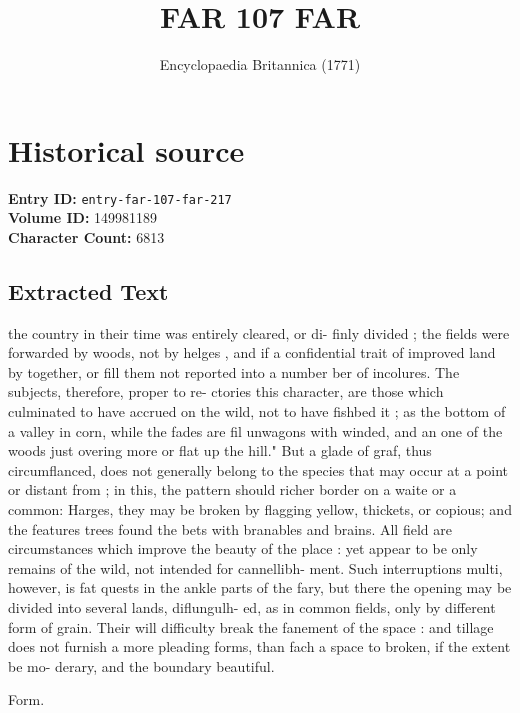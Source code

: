 \documentclass{article}
\title{FAR  107 FAR}
\date{Encyclopaedia Britannica (1771)}
\begin{document}
\maketitle

\section*{Historical source}
\textbf{Entry ID:} \texttt{entry-far-107-far-217} \\
\textbf{Volume ID:} 149981189 \\
\textbf{Character Count:} 6813

\subsection*{Extracted Text}
the country in their time was entirely cleared, or di-
finly divided ; the fields were forwarded by woods,
not by helges , and if a confidential trait of improved
land by together, or fill them not reported into a number
ber of incolures. The subjects, therefore, proper to re-
ctories this character, are those which culminated
to have accrued on the wild, not to have fishbed
it ; as the bottom of a valley in corn, while the fades
are fil unwagons with winded, and an one of the
woods just overing more or flat up
the hill." But a glade of graf, thus circumflanced,
does not generally belong to the species that may
occur at a point or distant from ; in this, the pattern
should richer border on a waite or a common: Harges,
they may be broken by flagging yellow, thickets, or
copious; and the features trees found the bets with
branables and brains. All field are circumstances
which improve the beauty of the place : yet appear to
be only remains of the wild, not intended for cannellibh-
ment. Such interruptions multi, however, is fat
quests in the ankle parts of the fary, but
there the opening may be divided into several lands, diflungulh-
ed, as in common fields, only by different form of grain.
Their will difficulty break the fanement of
the space : and tillage does not furnish a more pleading
forms, than fach a space to broken, if the extent be mo-
derary, and the boundary beautiful.

Form.
\end{document}

